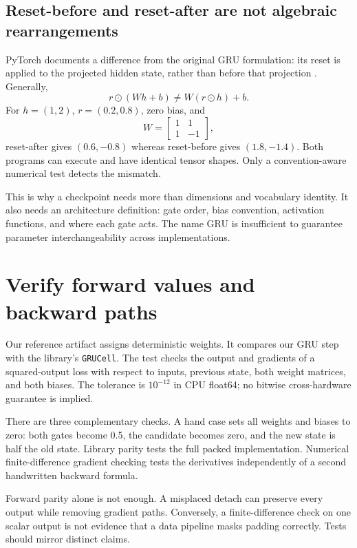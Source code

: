 \subsection{Reset-before and reset-after are not algebraic rearrangements}

PyTorch documents a difference from the original GRU formulation:
its reset is applied to the projected hidden state, rather than before
that projection \cite{gru-variant}. Generally,
\begin{equation}
r\odot(Wh+b)\ne W(r\odot h)+b.
\end{equation}
For $h=(1,2)$, $r=(0.2,0.8)$, zero bias, and
\begin{equation}
W=\begin{bmatrix}1&1\\1&-1\end{bmatrix},
\end{equation}
reset-after gives $(0.6,-0.8)$ whereas reset-before gives $(1.8,-1.4)$.
Both programs can execute and have identical tensor shapes. Only a
convention-aware numerical test detects the mismatch.

This is why a checkpoint needs more than dimensions and vocabulary identity.
It also needs an architecture definition: gate order, bias convention,
activation functions, and where each gate acts. The name GRU is insufficient
to guarantee parameter interchangeability across implementations.

\section{Verify forward values and backward paths}

Our reference artifact assigns deterministic weights.
It compares our GRU step with the library's \texttt{GRUCell}. The test checks the
output and gradients of a squared-output loss with respect to inputs,
previous state, both weight matrices, and both biases.
The tolerance is $10^{-12}$ in CPU float64; no bitwise cross-hardware
guarantee is implied.

There are three complementary checks. A hand case sets all weights and
biases to zero: both gates become 0.5, the candidate becomes zero, and the
new state is half the old state. Library parity tests the full packed
implementation. Numerical finite-difference gradient checking tests the
derivatives independently of a second handwritten backward formula.

Forward parity alone is not enough. A misplaced detach can preserve every
output while removing gradient paths. Conversely, a finite-difference
check on one scalar output is not evidence that a data pipeline masks
padding correctly. Tests should mirror distinct claims.

